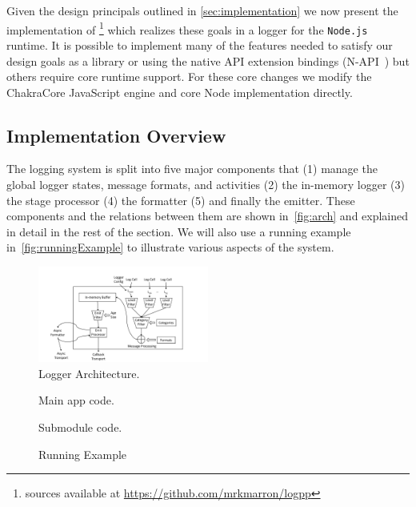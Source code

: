 Given the design principals outlined in \autoref{sec:implementation} we now 
present the implementation of \projn\footnote{\projn sources available at 
\url{https://github.com/mrkmarron/logpp}} which realizes these goals in a logger 
for the \texttt{Node.js}~\cite{Node} runtime. It is possible to implement many 
of the features needed to satisfy our design goals as a library or using the 
native API extension bindings (N-API~\cite{NAPI}) but others require core 
runtime support. For these core changes we modify the ChakraCore JavaScript 
engine and core Node implementation directly.

\subsection{Implementation Overview}
The logging system is split into five major components that (1) manage the 
global logger states, message formats, and activities (2) the in-memory logger 
(3) the stage processor (4) the formatter (5) and finally the emitter. These 
components and the relations between them are shown in~\autoref{fig:arch} and 
explained in detail in the rest of the section. We will also use a running 
example in~\autoref{fig:runningExample} to illustrate various aspects of the 
system.

\begin{figure}
    \centering
    \includegraphics[width=0.5\textwidth,angle=-90]{Figures/ArchDiagram}
    \caption{Logger Architecture.}
    \label{fig:arch}
\end{figure}


\begin{figure}[t]
\begin{minipage}[b]{0.47\textwidth}
     
    \caption{Main app code.}
    \label{fig:appmain}
\end{minipage}
\begin{minipage}[b]{0.47\textwidth}
    
    \caption{Submodule code.}
    \label{fig:appsub}
\end{minipage}
\caption{Running Example}
\label{fig:runningExample}
\end{figure}


